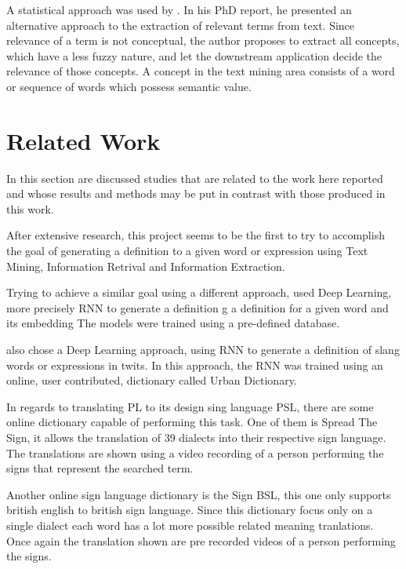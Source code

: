 A statistical approach was used by \textcite{ventura_2014}. 
In his PhD report, he presented an alternative approach to the extraction of relevant terms from text.
Since relevance of a term is not conceptual, the author proposes to extract all concepts, which have a less fuzzy nature, and let the downstream application decide the relevance of those concepts.
A concept in the text mining area consists of a word or sequence of words which possess semantic value.

\section{Related Work}

In this section are discussed studies that are related to the work here reported and whose results and methods may be put in contrast with those produced in this work.

After extensive research, this project seems to be the first to try to accomplish the goal of generating a definition to a given word or expression using Text Mining, Information Retrival and Information Extraction.

Trying to achieve a similar goal using a different approach, \textcite{noraset_2016} used Deep Learning, more precisely \gls{RNN} to generate a definition g a definition for a given word and its embedding
The models were trained using a pre-defined database.

\textcite{ni_2017} also chose a Deep Learning approach, using \gls{RNN} to generate a definition of slang words or expressions in twits.
In this approach, the \gls{RNN} was trained using an online, user contributed, dictionary called Urban Dictionary.

In regards to translating PL to its design sing language PSL, there are some online dictionary capable of performing this task. 
One of them is Spread The Sign, it allows the translation of 39 dialects into their respective sign language.
The translations are shown using a video recording of a person performing the signs that represent the searched term.

Another online sign language dictionary is the Sign BSL, this one only supports british english to british sign language.
Since this dictionary focus only on a single dialect each word has a lot more possible related meaning tranlations.
Once again the translation shown are pre recorded videos of a person performing the signs.


